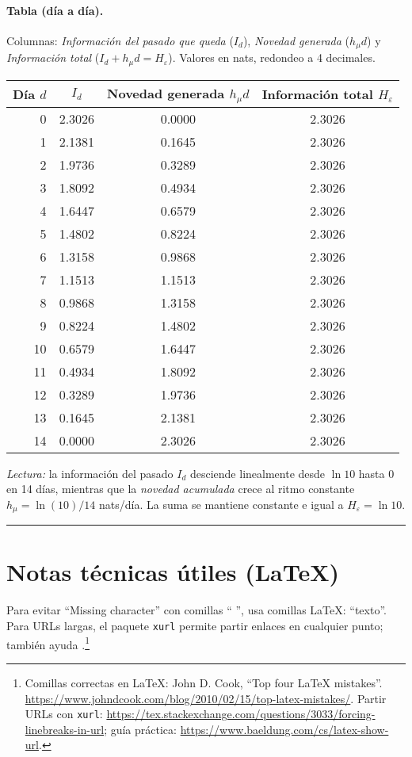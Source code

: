 \documentclass[11pt,a4paper]{article}
\begin{document}
\paragraph{Tabla (d\'ia a d\'ia).}
Columnas: \emph{Informaci\'on del pasado que queda} ($I_d$), \emph{Novedad generada} ($h_\mu d$) y
\emph{Informaci\'on total} ($I_d+h_\mu d = H_\varepsilon$). Valores en nats, redondeo a 4 decimales.

\begin{center}
\begin{tabular}{rccc}
\toprule
D\'ia $d$ & $I_d$ & Novedad generada $h_\mu d$ & Informaci\'on total $H_\varepsilon$ \\
\midrule
0  & 2.3026 & 0.0000 & 2.3026 \\
1  & 2.1381 & 0.1645 & 2.3026 \\
2  & 1.9736 & 0.3289 & 2.3026 \\
3  & 1.8092 & 0.4934 & 2.3026 \\
4  & 1.6447 & 0.6579 & 2.3026 \\
5  & 1.4802 & 0.8224 & 2.3026 \\
6  & 1.3158 & 0.9868 & 2.3026 \\
7  & 1.1513 & 1.1513 & 2.3026 \\
8  & 0.9868 & 1.3158 & 2.3026 \\
9  & 0.8224 & 1.4802 & 2.3026 \\
10 & 0.6579 & 1.6447 & 2.3026 \\
11 & 0.4934 & 1.8092 & 2.3026 \\
12 & 0.3289 & 1.9736 & 2.3026 \\
13 & 0.1645 & 2.1381 & 2.3026 \\
14 & 0.0000 & 2.3026 & 2.3026 \\
\bottomrule
\end{tabular}
\end{center}

\noindent
\emph{Lectura:} la informaci\'on del pasado $I_d$ desciende linealmente desde $\ln 10$ hasta $0$ en 14 d\'ias,
mientras que la \emph{novedad acumulada} crece al ritmo constante $h_\mu=\ln(10)/14$ nats/d\'ia. La suma
se mantiene constante e igual a $H_\varepsilon=\ln 10$.

\bigskip\hrule\bigskip

\section*{Notas técnicas útiles (LaTeX)}
Para evitar ``Missing character'' con comillas “ ”, usa comillas LaTeX: ``texto''. Para URLs largas, el paquete \texttt{xurl} permite partir enlaces en cualquier punto; también ayuda \texttt{\string\sloppy}.\footnote{Comillas correctas en LaTeX: John D. Cook, ``Top four LaTeX mistakes''. \url{https://www.johndcook.com/blog/2010/02/15/top-latex-mistakes/}. \; Partir URLs con \texttt{xurl}: \url{https://tex.stackexchange.com/questions/3033/forcing-linebreaks-in-url}; guía práctica: \url{https://www.baeldung.com/cs/latex-show-url}.}
\end{document}
